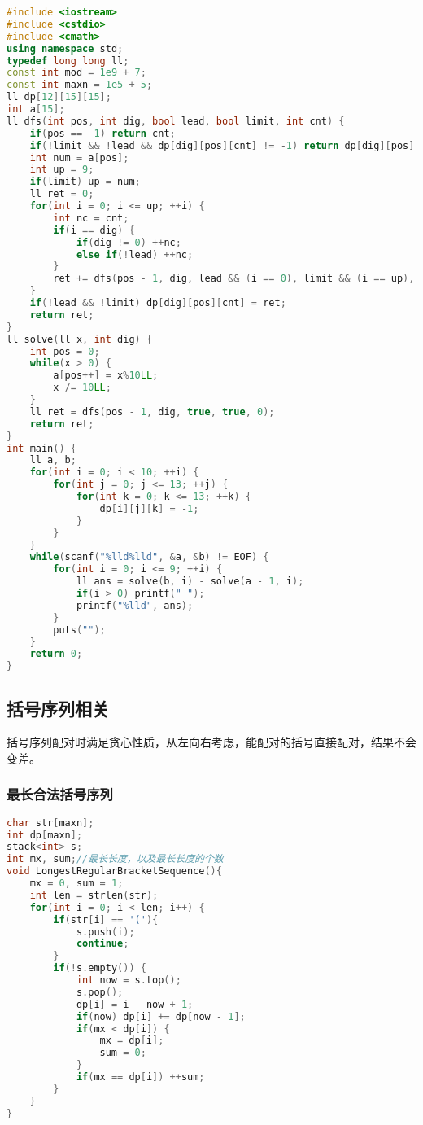 \begin{lstlisting}[language=C++]
#include <iostream>
#include <cstdio>
#include <cmath>
using namespace std;
typedef long long ll;
const int mod = 1e9 + 7;
const int maxn = 1e5 + 5;
ll dp[12][15][15];
int a[15];
ll dfs(int pos, int dig, bool lead, bool limit, int cnt) {
    if(pos == -1) return cnt;
    if(!limit && !lead && dp[dig][pos][cnt] != -1) return dp[dig][pos][cnt];
    int num = a[pos];
    int up = 9;
    if(limit) up = num;
    ll ret = 0;
    for(int i = 0; i <= up; ++i) {
        int nc = cnt;
        if(i == dig) {
            if(dig != 0) ++nc;
            else if(!lead) ++nc;
        }
        ret += dfs(pos - 1, dig, lead && (i == 0), limit && (i == up), nc);
    }
    if(!lead && !limit) dp[dig][pos][cnt] = ret;
    return ret;
}
ll solve(ll x, int dig) {
    int pos = 0;
    while(x > 0) {
        a[pos++] = x%10LL;
        x /= 10LL;
    }
    ll ret = dfs(pos - 1, dig, true, true, 0);
    return ret;
}
int main() {
    ll a, b;
    for(int i = 0; i < 10; ++i) {
        for(int j = 0; j <= 13; ++j) {
            for(int k = 0; k <= 13; ++k) {
                dp[i][j][k] = -1;
            }
        }
    }
    while(scanf("%lld%lld", &a, &b) != EOF) {
        for(int i = 0; i <= 9; ++i) {
            ll ans = solve(b, i) - solve(a - 1, i);
            if(i > 0) printf(" ");
            printf("%lld", ans);
        }
        puts("");
    }
    return 0;
}
\end{lstlisting}

\subsection{括号序列相关}

括号序列配对时满足贪心性质，从左向右考虑，能配对的括号直接配对，结果不会变差。

\subsubsection{最长合法括号序列}

\begin{lstlisting}[language=C++]
char str[maxn];
int dp[maxn];
stack<int> s;
int mx, sum;//最长长度，以及最长长度的个数
void LongestRegularBracketSequence(){
    mx = 0, sum = 1;
    int len = strlen(str);
    for(int i = 0; i < len; i++) {
        if(str[i] == '('){
            s.push(i);
            continue;
        }
        if(!s.empty()) {
            int now = s.top();
            s.pop();
            dp[i] = i - now + 1;
            if(now) dp[i] += dp[now - 1];
            if(mx < dp[i]) {
                mx = dp[i];
                sum = 0;
            }
            if(mx == dp[i]) ++sum;
        }
    }
}
\end{lstlisting}


